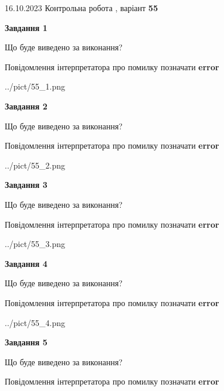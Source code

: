 \documentclass[12pt, ukrainian]{article}
\begin{document}
{\Large{16.10.2023 Контрольна робота , варіант  \No \textbf { 55 }\par}}
{
\begin {large}
{\begin {center}\textbf{Завдання 1}\end {center}}\par
Що буде виведено за виконання? \par
Повідомлення інтерпретатора про помилку позначати \textbf{error}

\begin{center}
	{../pict/55_1.png}
\end{center}
\newpage

{\begin {center}\textbf{Завдання 2}\end {center}}\par
Що буде виведено за виконання? \par
Повідомлення інтерпретатора про помилку позначати \textbf{error}

\begin{center}
	{../pict/55_2.png}
\end{center}
\newpage

{\begin {center}\textbf{Завдання 3}\end {center}}\par
Що буде виведено за виконання? \par
Повідомлення інтерпретатора про помилку позначати \textbf{error}

\begin{center}
	{../pict/55_3.png}
\end{center}
\newpage

{\begin {center}\textbf{Завдання 4}\end {center}}\par
Що буде виведено за виконання? \par
Повідомлення інтерпретатора про помилку позначати \textbf{error}

\begin{center}
	{../pict/55_4.png}
\end{center}
\newpage

{\begin {center}\textbf{Завдання 5}\end {center}}\par
Що буде виведено за виконання? \par
Повідомлення інтерпретатора про помилку позначати \textbf{error}


\end{large}}
\end{document}
